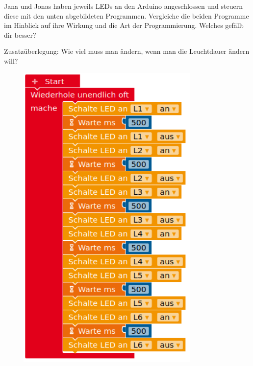 \begin{aufgabe}
	Jana und Jonas haben jeweils LEDs an den Arduino angeschlossen und steuern diese mit den unten abgebildeten Programmen. Vergleiche die beiden Programme im Hinblick auf ihre Wirkung und die Art der Programmierung. Welches gefällt dir besser?
	
	Zusatzüberlegung: Wie viel muss man ändern, wenn man die Leuchtdauer ändern will?
\end{aufgabe}

\begin{figure}[H]
	\begin{minipage}{0.48\textwidth}
		\centering
		\includegraphics[width=0.8\textwidth]{./pics/lauflicht-ohne-variable.png}

\end{minipage}
\end{figure}

